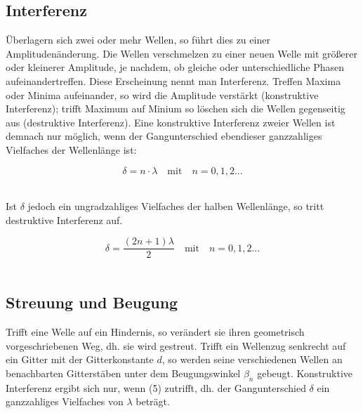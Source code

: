 \documentclass[12pt,a4paper,titlepage,headinclude,bibtotoc]{scrartcl}
\begin{document}
\vspace{2 cm}

\subsection{Interferenz}
Überlagern sich zwei oder mehr Wellen, so führt dies zu einer Amplitudenänderung. Die Wellen verschmelzen zu einer neuen Welle mit größerer oder kleinerer Amplitude, je nachdem, ob gleiche oder unterschiedliche Phasen aufeinandertreffen. Diese Erscheinung nennt man Interferenz. Treffen Maxima oder Minima aufeinander, so wird die Amplitude verstärkt (konstruktive Interferenz); trifft Maximum auf Minium so löschen sich die Wellen gegenseitig aus (destruktive Interferenz). 
Eine konstruktive Interferenz zweier Wellen ist demnach nur möglich, wenn der Gangunterschied ebendieser ganzzahliges Vielfaches der Wellenlänge ist:\\
\par
\begin{equation}
\delta={n}\cdot {\lambda} \quad \mathrm{mit}\quad n = 0,1,2...
\end{equation}
\\
\par

Ist $\delta$ jedoch ein ungradzahliges Vielfaches der halben Wellenlänge, so tritt destruktive Interferenz auf. \\
\par
\begin{equation}
\delta = \frac{(2n+1)\lambda}{2} \quad \mathrm{mit}\quad  n=0,1,2...
\end{equation}
\\
\par


\subsection{Streuung und Beugung}
Trifft eine Welle auf ein Hindernis, so verändert sie ihren geometrisch vorgeschriebenen Weg, dh. sie wird gestreut. %
Trifft ein Wellenzug senkrecht auf ein Gitter mit der Gitterkonstante $d$, so werden seine verschiedenen Wellen an benachbarten Gitterstäben unter dem Beugungswinkel $\beta_n$ gebeugt. Konstruktive Interferenz ergibt sich nur, wenn (5) zutrifft, dh. der Gangunterschied $\delta$ ein ganzzahliges Vielfaches von $\lambda$ beträgt.
\end{document}
